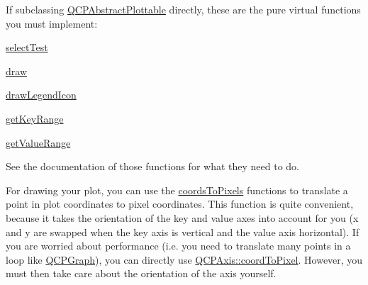 If subclassing \mbox{\hyperlink{class_q_c_p_abstract_plottable}{Q\+C\+P\+Abstract\+Plottable}} directly, these are the pure virtual functions you must implement\+: \begin{DoxyItemize}
\item \mbox{\hyperlink{class_q_c_p_abstract_plottable_addb3f5c41f007a78c3e142cc605bc712}{select\+Test}} \item \mbox{\hyperlink{class_q_c_p_abstract_plottable_a453f676a5cee7bf846c5f0fa05ea84b3}{draw}} \item \mbox{\hyperlink{class_q_c_p_abstract_plottable_a9a450783fd9ed539e589999fd390cdf7}{draw\+Legend\+Icon}} \item \mbox{\hyperlink{class_q_c_p_abstract_plottable_a4da16d3cd4b509e1104a9b0275623c96}{get\+Key\+Range}} \item \mbox{\hyperlink{class_q_c_p_abstract_plottable_a4de773988b21ed090fddd27c6a3a3dcb}{get\+Value\+Range}}\end{DoxyItemize}
See the documentation of those functions for what they need to do.

For drawing your plot, you can use the \mbox{\hyperlink{class_q_c_p_abstract_plottable_a7ad84a36472441cf1f555c5683d0da93}{coords\+To\+Pixels}} functions to translate a point in plot coordinates to pixel coordinates. This function is quite convenient, because it takes the orientation of the key and value axes into account for you (x and y are swapped when the key axis is vertical and the value axis horizontal). If you are worried about performance (i.\+e. you need to translate many points in a loop like \mbox{\hyperlink{class_q_c_p_graph}{Q\+C\+P\+Graph}}), you can directly use \mbox{\hyperlink{class_q_c_p_axis_af15d1b3a7f7e9b53d759d3ccff1fe4b4}{Q\+C\+P\+Axis\+::coord\+To\+Pixel}}. However, you must then take care about the orientation of the axis yourself.

